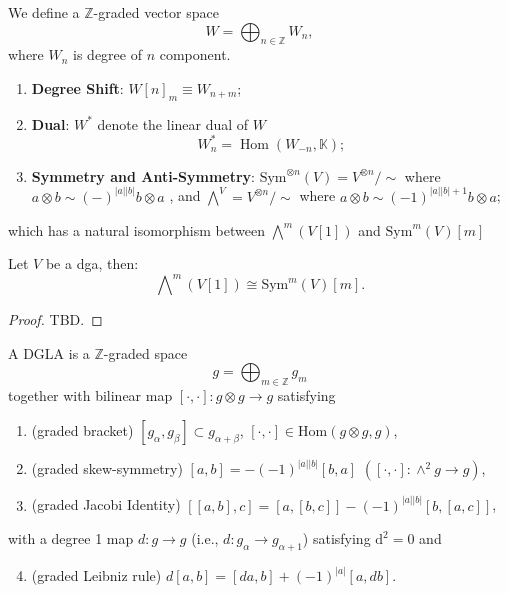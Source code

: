 \documentclass[10pt]{article}
\newcommand{\Hom}{\operatorname{Hom}}
\begin{document}
We define a $ \mathbb{Z}$-graded vector space
\begin{equation*}
  W = \bigoplus_{n \in \mathbb{Z}} W_{n},
\end{equation*}
where $ W_{n}$ is degree of $ n$ component.
\begin{enumerate}
  \item \textbf{Degree Shift}: $ W[n]_{m} \equiv W_{n+m}$;
  \item \textbf{Dual}: $ W^{*}$ denote the linear dual of $ W$
    \begin{equation*}
      W^{*}_{n} = \Hom(W_{-n}, \mathbb{K});
    \end{equation*}
  \item \textbf{Symmetry and Anti-Symmetry}: $ \mathrm{Sym}^{\otimes n}(V) = V^{\otimes n} / \sim $ where $a \otimes b \sim (-)^{|a||b|} b \otimes a$ ,
    and $ \bigwedge\nolimits^{V} = V^{\otimes n} / \sim $ where $ a \otimes b \sim (-1)^{|a||b|+1} b \otimes a$;
\end{enumerate}
which has a natural isomorphism between $    \bigwedge\nolimits^{m} \left( V[1] \right) $ and $\mathrm{Sym}^{m} (V)[m]$
\begin{proposition}
  Let $ V$ be a dga, then:
  \begin{equation*}
    \bigwedge\nolimits^{m} \left( V[1] \right) \cong \mathrm{Sym}^{m} (V)[m].
  \end{equation*}
\end{proposition}
\begin{proof}
  TBD.
\end{proof}

\begin{definition}
  A DGLA is a $\mathbb{Z}$-graded space
  \begin{equation*}
    g = \bigoplus_{m \in \mathbb{Z}} g_m
  \end{equation*}
  together with bilinear map $[\cdot,\cdot]: g \otimes g \to g$ satisfying
  \begin{enumerate}
    \item (graded bracket) $[g_\alpha, g_\beta] \subset g_{\alpha+\beta}$, $[\cdot,\cdot] \in \text{Hom}(g \otimes g, g)$,
    \item (graded skew-symmetry) $[a,b] = -(-1)^{|a||b|}[b,a]$ \quad $\left([\cdot,\cdot]: \wedge^2 g \to g\right)$,
    \item (graded Jacobi Identity) $[[a,b],c] = [a,[b,c]] - (-1)^{|a||b|}[b,[a,c]]$,
  \end{enumerate}
  with a degree 1 map $d: g \to g$ (i.e., $d: g_\alpha \to g_{\alpha+1}$) satisfying $ \mathrm{d} ^{2} = 0$ and
  \begin{enumerate}
      \setcounter{enumi}{3}
    \item (graded Leibniz rule) $d[a,b] = [da,b] + (-1)^{|a|}[a,db]$.
  \end{enumerate}
\end{definition}
\end{document}

